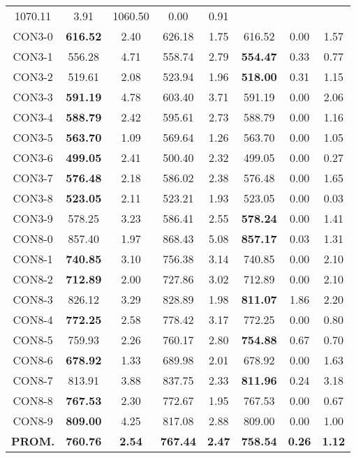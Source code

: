 \begin{table}[h]
\begin{tabular}{c c c c c c c c}
1070.11 & 3.91 & 1060.50 & 0.00
 & 0.91\\CON3-0 & \bf{616.52} & 2.40 & 
626.18 & 1.75 & 616.52 & 0.00
 & 1.57\\CON3-1 & 556.28 & 4.71 & 
558.74 & 2.79 & \bf{554.47} & 
0.33 & 0.77\\CON3-2 & 519.61 & 2.08 & 
523.94 & 1.96 & \bf{518.00} & 
0.31 & 1.15\\CON3-3 & \bf{591.19} & 4.78 & 
603.40 & 3.71 & 591.19 & 0.00
 & 2.06\\CON3-4 & \bf{588.79} & 2.42 & 
595.61 & 2.73 & 588.79 & 0.00
 & 1.16\\CON3-5 & \bf{563.70} & 1.09 & 
569.64 & 1.26 & 563.70 & 0.00
 & 1.05\\CON3-6 & \bf{499.05} & 2.41 & 
500.40 & 2.32 & 499.05 & 0.00
 & 0.27\\CON3-7 & \bf{576.48} & 2.18 & 
586.02 & 2.38 & 576.48 & 0.00
 & 1.65\\CON3-8 & \bf{523.05} & 2.11 & 
523.21 & 1.93 & 523.05 & 0.00
 & 0.03\\CON3-9 & 578.25 & 3.23 & 
586.41 & 2.55 & \bf{578.24} & 
0.00 & 1.41\\CON8-0 & 857.40 & 1.97 & 
868.43 & 5.08 & \bf{857.17} & 
0.03 & 1.31\\CON8-1 & \bf{740.85} & 3.10 & 
756.38 & 3.14 & 740.85 & 0.00
 & 2.10\\CON8-2 & \bf{712.89} & 2.00 & 
727.86 & 3.02 & 712.89 & 0.00
 & 2.10\\CON8-3 & 826.12 & 3.29 & 
828.89 & 1.98 & \bf{811.07} & 
1.86 & 2.20\\CON8-4 & \bf{772.25} & 2.58 & 
778.42 & 3.17 & 772.25 & 0.00
 & 0.80\\CON8-5 & 759.93 & 2.26 & 
760.17 & 2.80 & \bf{754.88} & 
0.67 & 0.70\\CON8-6 & \bf{678.92} & 1.33 & 
689.98 & 2.01 & 678.92 & 0.00
 & 1.63\\CON8-7 & 813.91 & 3.88 & 
837.75 & 2.33 & \bf{811.96} & 
0.24 & 3.18\\CON8-8 & \bf{767.53} & 2.30 & 
772.67 & 1.95 & 767.53 & 0.00
 & 0.67\\CON8-9 & \bf{809.00} & 4.25 & 
817.08 & 2.88 & 809.00 & 0.00
 & 1.00\\\bf{PROM.} & 
\bf{760.76} & \bf{2.54} & \bf{767.44} & \bf{2.47} & \bf{758.54} & \bf{0.26} & \bf{1.12}\\[1ex]\hline
\end{tabular}
\label{table:nonlin}
\end{table}

